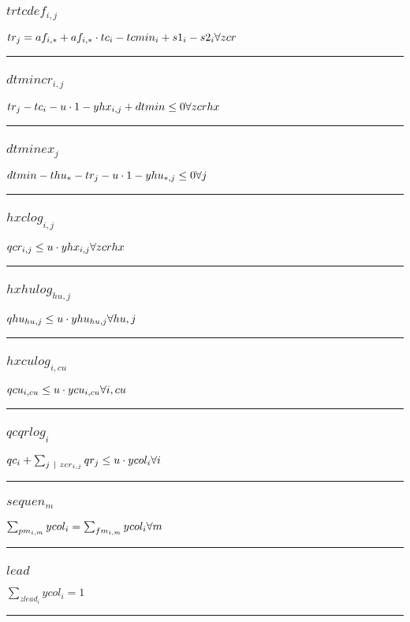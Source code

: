 \documentclass[11pt]{article}
\begin{document}
\subsubsection*{$trtcdef_{i,j}$}
$
tr_{j} = af_{i,*} + af_{i,*} \cdot tc_{i} - tcmin_{i} + s1_{i} - s2_{i}\hfill \forall zcr
$
\vspace{5pt}
\hrule
\subsubsection*{$dtmincr_{i,j}$}
$
tr_{j} - tc_{i} - u \cdot 1 - yhx_{i,j} + dtmin \leq 0\hfill \forall zcrhx
$
\vspace{5pt}
\hrule
\subsubsection*{$dtminex_{j}$}
$
dtmin - thu_{*} - tr_{j} - u \cdot 1 - yhu_{*,j} \leq 0\hfill \forall j
$
\vspace{5pt}
\hrule
\subsubsection*{$hxclog_{i,j}$}
$
qcr_{i,j} \leq u \cdot yhx_{i,j}\hfill \forall zcrhx
$
\vspace{5pt}
\hrule
\subsubsection*{$hxhulog_{hu,j}$}
$
qhu_{hu,j} \leq u \cdot yhu_{hu,j}\hfill \forall hu,j
$
\vspace{5pt}
\hrule
\subsubsection*{$hxculog_{i,cu}$}
$
qcu_{i,cu} \leq u \cdot ycu_{i,cu}\hfill \forall i,cu
$
\vspace{5pt}
\hrule
\subsubsection*{$qcqrlog_{i}$}
$
qc_{i} + \sum_{j ~ | ~ zcr_{i,j}} qr_{j} \leq u \cdot ycol_{i}\hfill \forall i
$
\vspace{5pt}
\hrule
\subsubsection*{$sequen_{m}$}
$
\sum_{pm_{i,m}} ycol_{i} = \sum_{fm_{i,m}} ycol_{i}\hfill \forall m
$
\vspace{5pt}
\hrule
\subsubsection*{$lead$}
$
\sum_{zlead_{i}} ycol_{i} = 1
$
\vspace{5pt}
\hrule
\end{document}
